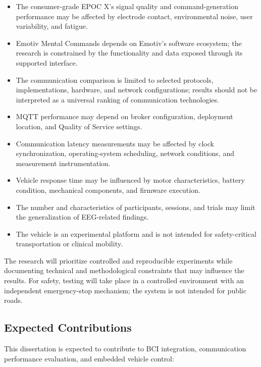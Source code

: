 \begin{itemize}
  \item The consumer-grade EPOC X's signal quality and command-generation performance may be affected by electrode contact, environmental noise, user variability, and fatigue.
  \item Emotiv Mental Commands depends on Emotiv's software ecosystem; the research is constrained by the functionality and data exposed through its supported interface.
  \item The communication comparison is limited to selected protocols, implementations, hardware, and network configurations; results should not be interpreted as a universal ranking of communication technologies.
  \item MQTT performance may depend on broker configuration, deployment location, and Quality of Service settings.
  \item Communication latency measurements may be affected by clock synchronization, operating-system scheduling, network conditions, and measurement instrumentation.
  \item Vehicle response time may be influenced by motor characteristics, battery condition, mechanical components, and firmware execution.
  \item The number and characteristics of participants, sessions, and trials may limit the generalization of EEG-related findings.
  \item The vehicle is an experimental platform and is not intended for safety-critical transportation or clinical mobility.
\end{itemize}

The research will prioritize controlled and reproducible experiments while documenting technical and methodological constraints that may influence the results. For safety, testing will take place in a controlled environment with an independent emergency-stop mechanism; the system is not intended for public roads.

\subsection{Expected Contributions}

This dissertation is expected to contribute to BCI integration, communication performance evaluation, and embedded vehicle control:

